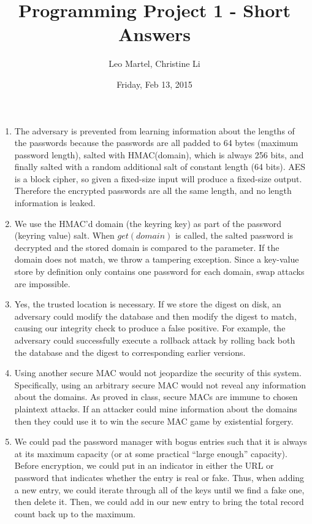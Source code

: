 \documentclass{article}[12pt]
\title{Programming Project 1 - Short Answers}
\author{Leo Martel, Christine Li}
\date{Friday, Feb 13, 2015}
\begin{document}
\maketitle

\begin{enumerate}[1.]
\item The adversary is prevented from learning information about the
  lengths of the passwords because the passwords are all padded to 64
  bytes (maximum password length), salted with HMAC(domain), which is
  always 256 bits, and finally salted with a random additional salt of
  constant length (64 bits). AES is a block cipher, so given a
  fixed-size input will produce a fixed-size output. Therefore the
  encrypted passwords are all the same length, and no length
  information is leaked.

\item We use the HMAC'd domain (the keyring key) as part of the
  password (keyring value) salt. When $get(domain)$ is called, the
  salted password is decrypted and the stored domain is compared to
  the parameter. If the domain does not match, we throw a tampering
  exception. Since a key-value store by definition only contains one
  password for each domain, swap attacks are impossible.

\item Yes, the trusted location is necessary. If we store the digest
  on disk, an adversary could modify the database and then modify the
  digest to match, causing our integrity check to produce a false
  positive. For example, the adversary could successfully execute a
  rollback attack by rolling back both the database and the digest to
  corresponding earlier versions.

\item Using another secure MAC would not jeopardize the security of
  this system. Specifically, using an arbitrary secure MAC would not
  reveal any information about the domains. As proved in class, secure
  MACs are immune to chosen plaintext attacks. If an attacker could
  mine information about the domains then they could use it to win the
  secure MAC game by existential forgery.

\item We could pad the password manager with bogus entries such that
  it is always at its maximum capacity (or at some practical “large
  enough” capacity). Before encryption, we could put in an indicator
  in either the URL or password that indicates whether the entry is
  real or fake. Thus, when adding a new entry, we could iterate
  through all of the keys until we find a fake one, then delete
  it. Then, we could add in our new entry to bring the total record
  count back up to the maximum.

\end{enumerate}
\end{document}
